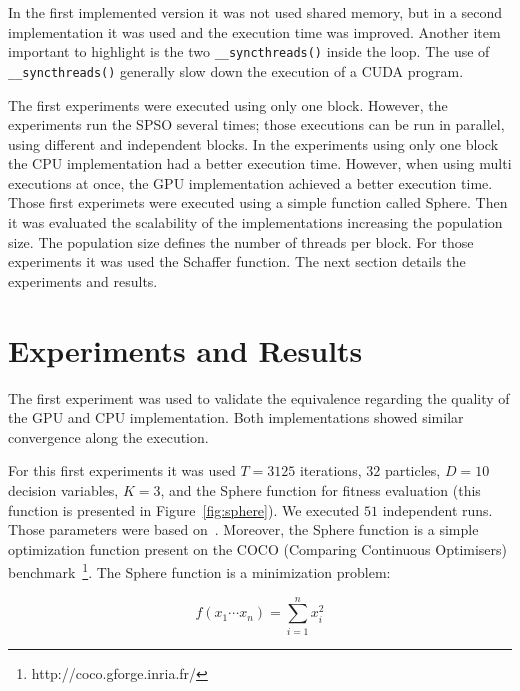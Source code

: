 \documentclass{article}
\begin{document}
    In the first implemented version it was not used shared memory, but in a second implementation it was used and the execution time was improved.
    Another item important to highlight is the two \texttt{\_\_syncthreads()} inside the loop.
    The use of \texttt{\_\_syncthreads()} generally slow down the execution of a CUDA program.

    The first experiments were executed using only one block. However, the experiments run the SPSO several times; those executions can be run in parallel, using different and independent blocks. In the experiments using only one block the CPU implementation had a better execution time. However, when using multi executions at once, the GPU implementation achieved a better execution time.
    Those first experimets were executed using a simple function called Sphere.
    Then it was evaluated the scalability of the implementations increasing the population size. The population size defines the number of threads per block. For those experiments it was used the Schaffer function.
    The next section details the experiments and results.

    \section{Experiments and Results}

    The first experiment was used to validate the equivalence regarding the quality of the GPU and CPU implementation. Both implementations showed similar convergence along the execution.

    For this first experiments it was used $T=3125$ iterations, $32$ particles, $D=10$ decision variables, $K=3$, and the Sphere function for fitness evaluation (this function is presented in Figure~\ref{fig:sphere}).  We executed $51$ independent runs. Those parameters were based on~\cite{SPSOCEC}. Moreover, the Sphere function is a simple optimization function present on the COCO (Comparing Continuous Optimisers) benchmark~\footnote{http://coco.gforge.inria.fr/}. The Sphere function is a minimization problem: 

    \begin{equation}
        f(x_1 \cdots x_n) = \sum_{i=1}^n x_i^2
    \end{equation}
\end{document}
